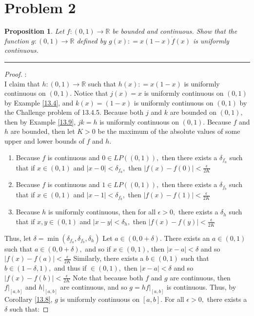 \documentclass[openany, amssymb, psamsfonts]{amsart}
\newcommand{\bbR}{\mathbb{R}}
\newtheorem{prop}{Proposition}[section]
\theoremstyle{definition}
\numberwithin{equation}{section}
\begin{document}
\section*{Problem 2}
\begin{prop}
    Let $f: (0,1) \to \bbR$ be bounded and continuous. Show that the function $g:(0,1)\to \bbR$ defined by $g(x): = x(1-x)\dot f(x)$ is uniformly continuous.
\end{prop}
\vspace{4pt}     \hrule   \vspace{4pt} \begin{proof}:\\
    I claim that $h: (0,1) \to \bbR$ such that $h(x): = x(1-x)$ is uniformly continuous on $(0,1).$ Notice that $j(x) = x$ is uniformly continuous on $(0,1)$ by Example \ref{13.4}, and $k(x) = (1-x)$ is uniformly continuous on $(0,1)$ by the Challenge problem of 13.4.5. Because both $j$ and $k$ are bounded on $(0,1),$ then by Example \ref{13.9}, $jk = h$ is uniformly continuous on $(0,1).$ \newline\newline
    Because $f$ and $h$ are bounded, then let $K>0$ be the maximum of the absolute values of some upper and lower bounds of $f$ and $h.$
    \begin{enumerate}
        \item Because $f$ is continuous and $0 \in LP((0,1)),$ then there exists a $\delta_{f_a}$ such that if $x\in (0,1)$ and $|x-0|< \delta_{f_a},$ then $|f(x) - f(0)|< \frac{\epsilon}{2K}$
        \item Because $f$ is continuous and $1 \in LP((0,1)),$ then there exists a $\delta_{f_b}$ such that if $x\in (0,1)$ and $|x-1|< \delta_{f_b},$ then $|f(x) - f(1)|< \frac{\epsilon}{2K}$
        \item Because $h$ is uniformly continuous, then for all $\epsilon>0,$ there exists a $\delta_h$ such that if $x,y \in (0,1)$ and $|x-y|< \delta_h,$ then $|f(x) - f(y)|< \frac{\epsilon}{2K}$
    \end{enumerate}
    Thus, let $\delta  = \min(\delta_{f_a}, \delta_{f_b}, \delta_{h})$ Let $a\in (0, 0+ \delta).$ There exists an $a\in (0,1)$ such that $a \in (0, 0 + \delta),$ and so if $x\in (0,1)$, then $|x-a|<\delta$ and so $|f(x) - f(a)|< \frac{\epsilon}{2K}$ Similarly, there exists a $b \in (0,1)$ such that $b \in (1-\delta, 1),$ and thus if $\in (0,1),$ then $|x-a|< \delta$ and so $|f(x) - f(b)|<\frac{\epsilon}{2K}$ Note that because both $f$ and $g$ are continuous, then $f|_{[a,b]}$ and $h|_{[a,b]}$ are continuous, and so $g = hf|_{[a,b]}$ is continuous. Thus, by Corollary \ref{13.8}, $g$ is uniformly continuous on $[a,b].$ For all $\epsilon>0,$ there exists a $\delta$ such that:

\end{proof}
\end{document}
